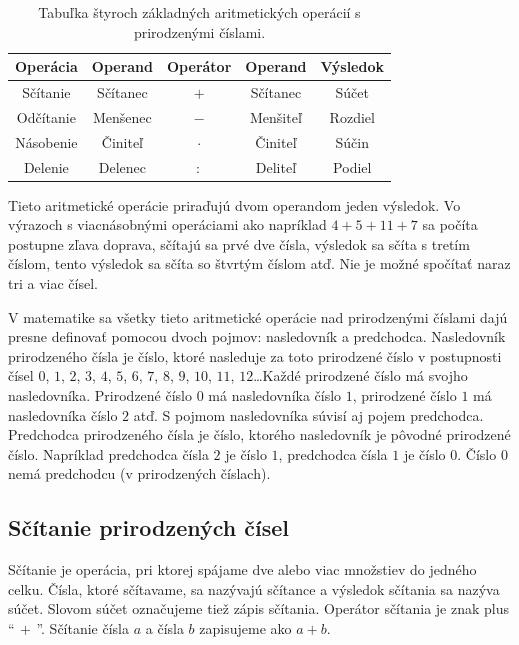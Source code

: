 \documentclass{article}
\begin{document}
\begin{table}[H]
  \centering
  \renewcommand{\arraystretch}{1.3}
  \begin{tabular}{c|c|c|c|c}
    Operácia & Operand & Operátor & Operand & Výsledok \\
    \hline
    Sčítanie & Sčítanec & \(+\) & Sčítanec & Súčet \\
    Odčítanie & Menšenec & \(-\) & Menšiteľ & Rozdiel \\
    Násobenie & Činiteľ & \(\cdot\) & Činiteľ & Súčin \\
    Delenie & Delenec & \(:\) & Deliteľ & Podiel \\
  \end{tabular}
  \caption{Tabuľka štyroch základných aritmetických operácií s prirodzenými číslami.}
\end{table}

Tieto aritmetické operácie priraďujú dvom operandom jeden výsledok. Vo výrazoch s viacnásobnými operáciami ako napríklad \(4 + 5 + 11 + 7\) sa počíta postupne zľava doprava, sčítajú sa prvé dve čísla, výsledok sa sčíta s tretím číslom, tento výsledok sa sčíta so štvrtým číslom atď. Nie je možné spočítať naraz tri a viac čísel.

V matematike sa všetky tieto aritmetické operácie nad prirodzenými číslami dajú presne definovať pomocou dvoch pojmov: nasledovník a predchodca. Nasledovník prirodzeného čísla je číslo, ktoré nasleduje za toto prirodzené číslo v postupnosti čísel \(0\), \(1\), \(2\), \(3\), \(4\), \(5\), \(6\), \(7\), \(8\), \(9\), \(10\), \(11\), \(12\)\dots Každé prirodzené číslo má svojho nasledovníka. Prirodzené číslo \(0\) má nasledovníka číslo \(1\), prirodzené číslo \(1\) má nasledovníka číslo \(2\) atď. S pojmom nasledovníka súvisí aj pojem predchodca. Predchodca prirodzeného čísla je číslo, ktorého nasledovník je pôvodné prirodzené číslo. Napríklad predchodca čísla \(2\) je číslo \(1\), predchodca čísla \(1\) je číslo \(0\). Číslo \(0\) nemá predchodcu (v prirodzených číslach).

\subsection{Sčítanie prirodzených čísel}

Sčítanie je operácia, pri ktorej spájame dve alebo viac množstiev do jedného celku. Čísla, ktoré sčítavame, sa nazývajú sčítance a výsledok sčítania sa nazýva súčet. Slovom súčet označujeme tiež zápis sčítania. Operátor sčítania je znak plus \enquote{\(\, + \,\)}. Sčítanie čísla \(a\) a čísla \(b\) zapisujeme ako \(a + b\).
\end{document}
